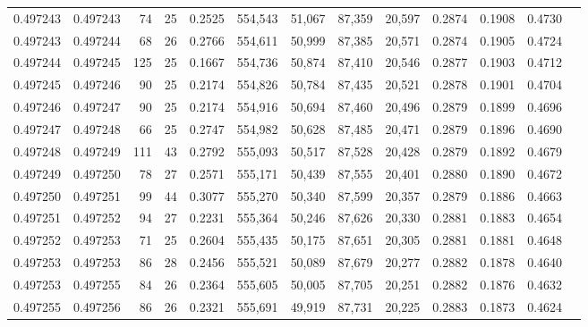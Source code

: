 \begin{tabular}{rrrrrrrrrrrrr}
0.497243 & 0.497243 &  74 &  25 &                                     0.2525 & 554,543 &  51,067 &  87,359 &  20,597 & 0.2874 & 0.1908 & 0.4730 \\
0.497243 & 0.497244 &  68 &  26 &                                     0.2766 & 554,611 &  50,999 &  87,385 &  20,571 & 0.2874 & 0.1905 & 0.4724 \\
0.497244 & 0.497245 & 125 &  25 &                                     0.1667 & 554,736 &  50,874 &  87,410 &  20,546 & 0.2877 & 0.1903 & 0.4712 \\
0.497245 & 0.497246 &  90 &  25 &                                     0.2174 & 554,826 &  50,784 &  87,435 &  20,521 & 0.2878 & 0.1901 & 0.4704 \\
0.497246 & 0.497247 &  90 &  25 &                                     0.2174 & 554,916 &  50,694 &  87,460 &  20,496 & 0.2879 & 0.1899 & 0.4696 \\
0.497247 & 0.497248 &  66 &  25 &                                     0.2747 & 554,982 &  50,628 &  87,485 &  20,471 & 0.2879 & 0.1896 & 0.4690 \\
0.497248 & 0.497249 & 111 &  43 &                                     0.2792 & 555,093 &  50,517 &  87,528 &  20,428 & 0.2879 & 0.1892 & 0.4679 \\
0.497249 & 0.497250 &  78 &  27 &                                     0.2571 & 555,171 &  50,439 &  87,555 &  20,401 & 0.2880 & 0.1890 & 0.4672 \\
0.497250 & 0.497251 &  99 &  44 &                                     0.3077 & 555,270 &  50,340 &  87,599 &  20,357 & 0.2879 & 0.1886 & 0.4663 \\
0.497251 & 0.497252 &  94 &  27 &                                     0.2231 & 555,364 &  50,246 &  87,626 &  20,330 & 0.2881 & 0.1883 & 0.4654 \\
0.497252 & 0.497253 &  71 &  25 &                                     0.2604 & 555,435 &  50,175 &  87,651 &  20,305 & 0.2881 & 0.1881 & 0.4648 \\
0.497253 & 0.497253 &  86 &  28 &                                     0.2456 & 555,521 &  50,089 &  87,679 &  20,277 & 0.2882 & 0.1878 & 0.4640 \\
0.497253 & 0.497255 &  84 &  26 &                                     0.2364 & 555,605 &  50,005 &  87,705 &  20,251 & 0.2882 & 0.1876 & 0.4632 \\
0.497255 & 0.497256 &  86 &  26 &                                     0.2321 & 555,691 &  49,919 &  87,731 &  20,225 & 0.2883 & 0.1873 & 0.4624 \\

\end{tabular}
